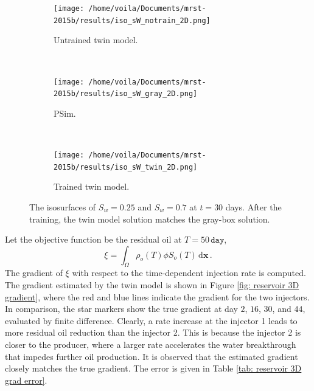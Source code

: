 \begin{figure}[htbp]\begin{center}
    \begin{subfigure}[t]{.99\textwidth}
        \centering
        \texttt{[image: /home/voila/Documents/mrst-2015b/results/iso\_sW\_notrain\_2D.png]}
        \label{fig: reservoir 3D untrained}
        \caption{Untrained twin model.}
    \end{subfigure}\\
    \begin{subfigure}[t]{.99\textwidth}
        \centering
        \texttt{[image: /home/voila/Documents/mrst-2015b/results/iso\_sW\_gray\_2D.png]}
        \label{fig: reservoir 3D untrained}
        \caption{PSim.}
    \end{subfigure}\\
    \begin{subfigure}[t]{.99\textwidth}
        \centering
        \texttt{[image: /home/voila/Documents/mrst-2015b/results/iso\_sW\_twin\_2D.png]}
        \label{fig: reservoir 3D untrained}
        \caption{Trained twin model.}
    \end{subfigure}
    \caption{The isosurfaces of $S_w=0.25$ and $S_w=0.7$ at $t=30$ days. After the training,
             the twin model solution matches the gray-box solution.}
    \label{fig: reservoir 3D solutions}
\end{center}\end{figure}

Let the objective function be the residual oil at $T=50 \, \texttt{day}$,
\begin{equation}
    \xi = \int_\Omega \rho_o(T) \phi S_o(T) \,\textrm{d} \boldsymbol{x} \,.
    \label{eqn: chap2 reservoir xi day 50}
\end{equation}
The gradient of $\xi$ with respect to the time-dependent injection rate is computed.
The gradient estimated by the twin model is shown in Figure \ref{fig: reservoir 3D gradient},
where the red and blue lines indicate the gradient for the two injectors. In comparison, 
the star markers show the true gradient at day $2$, $16$, $30$, and $44$, evaluated by finite difference.
Clearly, a rate increase at the injector 1 leads to more residual oil reduction than the injector 2.
This is because the injector 2 is closer to the producer, where a larger rate accelerates the 
water breakthrough that impedes further oil production.
It is observed that the estimated gradient closely matches the true gradient.
The error is given in Table \ref{tab: reservoir 3D grad error}.\\



